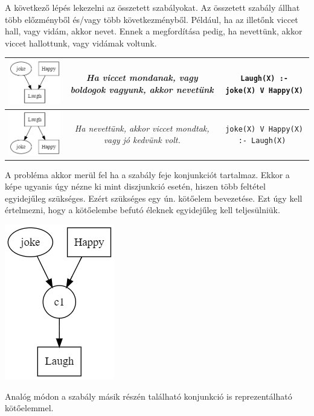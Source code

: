\newpage
A következő lépés lekezelni az összetett szabályokat. Az összetett szabály állhat több előzményből és/vagy több következményből. Például, ha az illetőnk viccet hall, vagy vidám, akkor nevet. Ennek a megfordítása pedig, ha nevettünk, akkor viccet hallottunk, vagy vidámak voltunk. 
\begin{table}[h!]
\centering
\begin{tabular}{|c|c|c|}
\hline
\includegraphics[scale=0.75]{images/joke2.png} & \textit{Ha viccet mondanak,  vagy boldogok vagyunk, akkor nevetünk} & \texttt{Laugh(X) :- joke(X) V Happy(X)}\\
\hline
\includegraphics[scale=0.75]{images/joke3.png} & \textit{Ha nevettünk, akkor viccet mondtak, vagy jó kedvünk volt.}& \texttt{joke(X) V Happy(X) :- Laugh(X) }\\
\hline
\end{tabular}
\end{table}
A probléma akkor merül fel ha a szabály feje konjunkciót tartalmaz. Ekkor a képe ugyanis úgy nézne ki mint diszjunkció esetén, hiszen több feltétel egyidejűleg szükséges. Ezért szükséges egy ún. kötőelem bevezetése. Ezt úgy kell értelmezni, hogy a kötőelembe befutó éleknek egyidejűleg kell teljesülniük. 
\begin{center}
\includegraphics[scale=0.75]{images/joke4} 
\end{center}
Analóg módon a szabály másik részén található konjunkció is reprezentálható kötőelemmel. 
